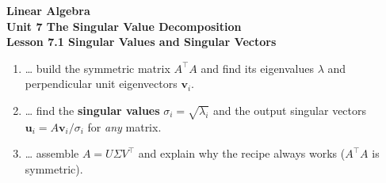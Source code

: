 \documentclass[10pt]{article}
\begin{document}
\vspace{-0.8in}

\begin{center}
  {\color{white}\textbf{\LARGE Linear Algebra}}\\[4pt]
  {\color{blushmid}\large\textbf{Unit 7 \quad The Singular Value Decomposition}}\\[6pt]
  {\color{white}\textbf{\large Lesson 7.1 \quad Singular Values and Singular Vectors}}
\end{center}

\vspace{0.22in}
\namedateperiod
\vspace{0.18in}

\begin{learningtargetbox}
\small
\begin{enumerate}[leftmargin=1.5em, itemsep=5pt]
  \item \ldots{} build the symmetric matrix $A^{\top}A$ and find its eigenvalues $\lambda$ and perpendicular unit eigenvectors $\mathbf{v}_i$.
  \item \ldots{} find the \textbf{singular values} $\sigma_i=\sqrt{\lambda_i}$ and the output singular vectors $\mathbf{u}_i=A\mathbf{v}_i/\sigma_i$ for \emph{any} matrix.
  \item \ldots{} assemble $A=U\Sigma V^{\top}$ and explain why the recipe always works ($A^{\top}A$ is symmetric).
\end{enumerate}
\end{learningtargetbox}

\vspace{0.14in}
\end{document}
